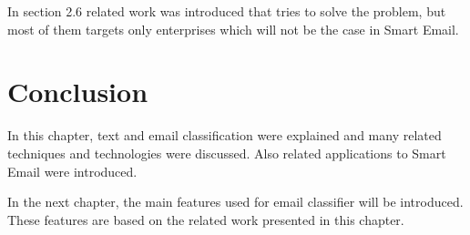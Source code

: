 In section 2.6 related work was introduced that tries to solve the problem, but most of them targets only enterprises which will not be the case in Smart Email.

\section{Conclusion}
In this chapter, text and email classification were explained and many related techniques and technologies were discussed. Also related applications to Smart Email were introduced.

In the next chapter, the main features used for email classifier will be introduced. These features are based on the related work presented in this chapter.